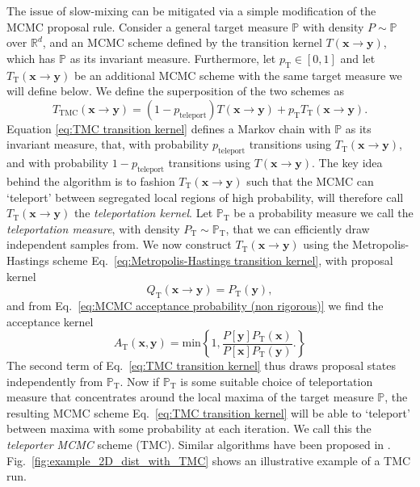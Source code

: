 The issue of slow-mixing can be mitigated via a simple modification of the MCMC proposal rule. Consider a general target measure $\mathbb{P}$ with density $P \sim \mathbb{P}$ over $\mathbb{R}^d$, and an MCMC scheme defined by the transition kernel $T(\mathbf{x} \to \mathbf{y})$, which has $\mathbb{P}$ as its invariant measure. Furthermore, let $p_\text{T} \in [0,1]$ and let $T_\text{T}(\mathbf{x} \to \mathbf{y})$ be an additional MCMC scheme with the same target measure we will define below. We define the superposition of the two schemes as
\begin{equation} \label{eq:TMC transition kernel}
	T_\text{TMC} (\mathbf{x} \to \mathbf{y}) = (1 - p_\text{teleport}) T(\mathbf{x} \to \mathbf{y}) + p_\text{T} T_\text{T}(\mathbf{x} \to \mathbf{y}).
\end{equation}
Equation \ref{eq:TMC transition kernel} defines a Markov chain with $\mathbb{P}$ as its invariant measure, that, with probability $p_\text{teleport}$ transitions using $T_\text{T}(\mathbf{x} \to \mathbf{y})$, and with probability $1-p_\text{teleport}$ transitions using $T(\mathbf{x} \to \mathbf{y})$. The key idea behind the algorithm is to fashion $T_\text{T}(\mathbf{x} \to \mathbf{y})$ such that the MCMC can `teleport' between segregated local regions of high probability, will therefore call $T_\text{T}(\mathbf{x} \to \mathbf{y})$ the \textit{teleportation kernel}. Let $\mathbb{P}_\text{T}$ be a probability measure we call the \textit{teleportation measure}, with density $P_\text{T} \sim \mathbb{P}_\text{T}$, that we can efficiently draw independent samples from. We now construct $T_\text{T}(\mathbf{x} \to \mathbf{y})$ using the Metropolis-Hastings scheme Eq.~\ref{eq:Metropolis-Hastings transition kernel}, with proposal kernel
\begin{equation} \label{eq:teleportation proposal}
	Q_\text{T}(\mathbf{x} \to \mathbf{y}) = P_\text{T}(\mathbf{y}),
\end{equation}
and from Eq.~\ref{eq:MCMC acceptance probability (non rigorous)} we find the acceptance kernel
\begin{equation} \label{eq:teleportation acceptance}
	A_\text{T}(\mathbf{x}, \mathbf{y}) = \text{min} \left\{
		1, \frac{P[\mathbf{y}] P_\text{T}(\mathbf{x}) }{P[\mathbf{x}] P_\text{T}(\mathbf{y}) }.
	\right\}
\end{equation}
The second term of Eq.~\ref{eq:TMC transition kernel} thus draws proposal states independently from $\mathbb{P}_\text{T}$. Now if $\mathbb{P}_\text{T}$ is some suitable choice of teleportation measure that concentrates around the local maxima of the target measure $\mathbb{P}$, the resulting MCMC scheme Eq.~\ref{eq:TMC transition kernel} will be able to `teleport' between maxima with some probability at each iteration. We call this the \textit{teleporter MCMC} scheme (TMC). Similar algorithms have been proposed in \citep{sminchisescuModeHoppingMCMCSampler, lindseyEnsembleMarkovChain2021}. Fig.~\ref{fig:example_2D_dist_with_TMC} shows an illustrative example of a TMC run.

